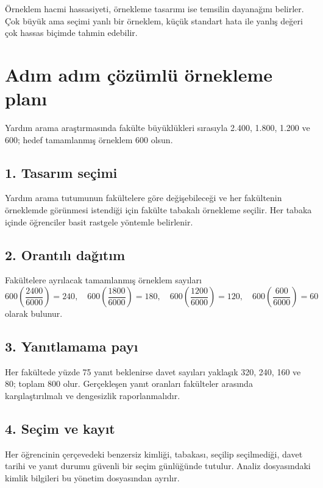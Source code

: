 \begin{sezgibox}
Örneklem hacmi hassasiyeti, örnekleme tasarımı ise temsilin dayanağını
belirler. Çok büyük ama seçimi yanlı bir örneklem, küçük standart hata ile
yanlış değeri çok hassas biçimde tahmin edebilir.
\end{sezgibox}

\section{Adım adım çözümlü örnekleme planı}

Yardım arama araştırmasında fakülte büyüklükleri sırasıyla 2.400, 1.800,
1.200 ve 600; hedef tamamlanmış örneklem 600 olsun.

\subsection*{1. Tasarım seçimi}

Yardım arama tutumunun fakültelere göre değişebileceği ve her fakültenin
örneklemde görünmesi istendiği için fakülte tabakalı örnekleme seçilir. Her
tabaka içinde öğrenciler basit rastgele yöntemle belirlenir.

\subsection*{2. Orantılı dağıtım}

Fakültelere ayrılacak tamamlanmış örneklem sayıları
\[
600\left(\frac{2400}{6000}\right)=240,\quad
600\left(\frac{1800}{6000}\right)=180,\quad
600\left(\frac{1200}{6000}\right)=120,\quad
600\left(\frac{600}{6000}\right)=60
\]
olarak bulunur.

\subsection*{3. Yanıtlamama payı}

Her fakültede yüzde 75 yanıt beklenirse davet sayıları yaklaşık 320, 240, 160
ve 80; toplam 800 olur. Gerçekleşen yanıt oranları fakülteler arasında
karşılaştırılmalı ve dengesizlik raporlanmalıdır.

\subsection*{4. Seçim ve kayıt}

Her öğrencinin çerçevedeki benzersiz kimliği, tabakası, seçilip seçilmediği,
davet tarihi ve yanıt durumu güvenli bir seçim günlüğünde tutulur. Analiz
dosyasındaki kimlik bilgileri bu yönetim dosyasından ayrılır.


